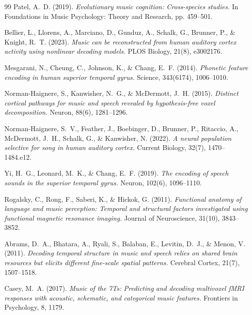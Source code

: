 \documentclass[11pt]{article}
\begin{document}
\clearpage
\begin{thebibliography}{99}
\small
{}
Patel, A.\ D. (2019).
\emph{Evolutionary music cognition: Cross-species studies.}
In Foundations in Music Psychology: Theory and Research, pp. 459--501.

Bellier, L., Llorens, A., Marciano, D., Gunduz, A., Schalk, G., Brunner, P., \& Knight, R.\ T. (2023).
\emph{Music can be reconstructed from human auditory cortex activity using nonlinear decoding models.}
PLOS Biology, 21(8), e3002176.

Mesgarani, N., Cheung, C., Johnson, K., \& Chang, E.\ F. (2014).
\emph{Phonetic feature encoding in human superior temporal gyrus.}
Science, 343(6174), 1006--1010.

Norman-Haignere, S., Kanwisher, N.\ G., \& McDermott, J.\ H. (2015).
\emph{Distinct cortical pathways for music and speech revealed by hypothesis-free voxel decomposition.}
Neuron, 88(6), 1281--1296.

Norman-Haignere, S.\ V., Feather, J., Boebinger, D., Brunner, P., Ritaccio, A., McDermott, J.\ H., Schalk, G., \& Kanwisher, N. (2022).
\emph{A neural population selective for song in human auditory cortex.}
Current Biology, 32(7), 1470--1484.e12.

Yi, H.\ G., Leonard, M.\ K., \& Chang, E.\ F. (2019).
\emph{The encoding of speech sounds in the superior temporal gyrus.}
Neuron, 102(6), 1096--1110.

Rogalsky, C., Rong, F., Saberi, K., \& Hickok, G. (2011).
\emph{Functional anatomy of language and music perception: Temporal and structural factors investigated using functional magnetic resonance imaging.}
Journal of Neuroscience, 31(10), 3843--3852.

Abrams, D.\ A., Bhatara, A., Ryali, S., Balaban, E., Levitin, D.\ J., \& Menon, V. (2011).
\emph{Decoding temporal structure in music and speech relies on shared brain resources but elicits different fine-scale spatial patterns.}
Cerebral Cortex, 21(7), 1507--1518.

Casey, M.\ A. (2017).
\emph{Music of the 7Ts: Predicting and decoding multivoxel fMRI responses with acoustic, schematic, and categorical music features.}
Frontiers in Psychology, 8, 1179.


\end{thebibliography}
\end{document}
